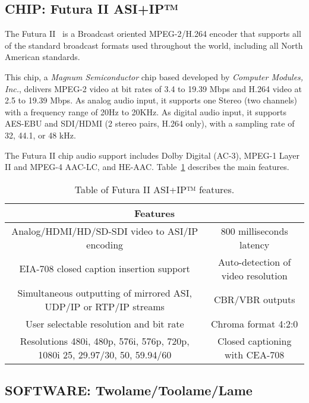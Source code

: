 \subsection{CHIP: Futura II ASI+IP™}

The Futura II~\cite{futura} is a Broadcast oriented MPEG-2/H.264 encoder that supports all of the standard broadcast formats used throughout the world, including all North American standards. 

This chip, a \textit{Magnum Semiconductor} chip based developed by \textit{Computer Modules, Inc.}, delivers MPEG-2 video at bit rates of 3.4 to 19.39 Mbps and H.264 video at 2.5 to 19.39 Mbps.
As analog audio input, it supports one Stereo (two channels) with a frequency range of 20Hz to 20KHz. As digital audio input, it supports AES-EBU and SDI/HDMI (2 stereo pairs, H.264 only), with a sampling rate of 32, 44.1, or 48 kHz.

The Futura II chip audio support includes Dolby Digital (AC-3), MPEG-1 Layer II and MPEG-4 AAC-LC, and HE-AAC.
Table~\ref{tab:futura} describes the main features.

\begin{table}[h]
    \centering
    \begin{tabular}{|c|c|}
        \hline
        \multicolumn{2}{|c|}{\textbf{Features}} \\
        \hline
         Analog/HDMI/HD/SD-SDI video to ASI/IP encoding & 800 milliseconds latency \\
         \hline
          EIA-708 closed caption insertion support & Auto-detection of video resolution \\
         \hline
         Simultaneous outputting of mirrored ASI, UDP/IP or RTP/IP streams & CBR/VBR outputs \\
         \hline
         User selectable resolution and bit rate & Chroma format 4:2:0 \\
         \hline
         Resolutions 480i, 480p, 576i, 576p, 720p, 1080i 25, 29.97/30, 50, 59.94/60 & Closed captioning with CEA-708 \\
         \hline
    \end{tabular}
    \caption{Table of Futura II ASI+IP™ features.}
    \label{tab:futura}
\end{table}

\subsection{SOFTWARE: Twolame/Toolame/Lame}

